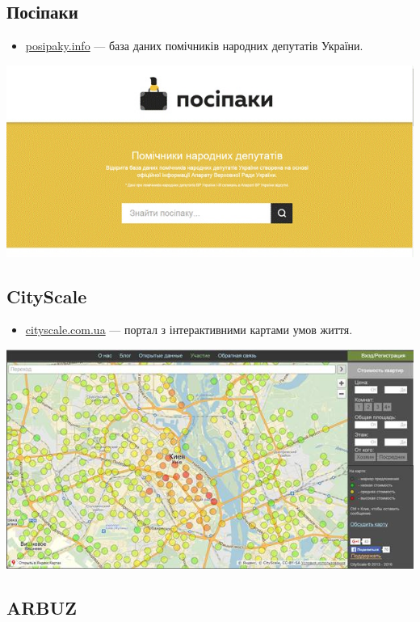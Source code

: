 \subsection{Посіпаки}

\begin{itemize}
    \item \href{http://posipaky.info/}{posipaky.info} — база даних помічників народних депутатів України.
\end{itemize}

\includegraphics{images/025.jpg}

\subsection{CityScale}

\begin{itemize}
    \item \href{http://www.cityscale.com.ua/}{cityscale.com.ua} — портал з інтерактивними картами умов життя.
\end{itemize}

\includegraphics{images/026.jpg}

\subsection{ARBUZ}

